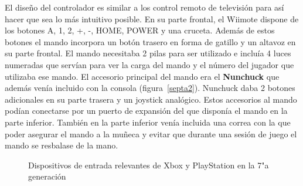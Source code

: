 El dise\~no del controlador es similar a los control remoto de televisi\'on para as\'i hacer que sea lo m\'as intuitivo posible. En su parte frontal, el Wiimote dispone de los botones A, 1, 2, +, -, HOME, POWER y una cruceta. Adem\'as de estos botones el mando incorpora un bot\'on trasero en forma de gatillo y un altavoz en su parte frontal. El mando necesitaba 2 pilas para ser utilizado e inclu\'ia 4 luces numeradas que serv\'ian para ver la carga del mando y el n\'umero del jugador que utilizaba ese mando. El accesorio principal del mando era el \textbf{Nunchuck} que adem\'as ven\'ia incluido con la consola (figura~\ref{septa2}). Nunchuck daba 2 botones adicionales en su parte trasera y un joystick anal\'ogico. Estos accesorios al mando pod\'ian conectarse por un puerto de expansi\'on del que dispon\'ia el mando en la parte inferior. Tambi\'en en la parte inferior ven\'ia incluida una correa con la que poder asegurar el mando a la mu\~neca y evitar que durante una sesi\'on de juego el mando se resbalase de la mano.\\

\begin{figure}[t]
     \hfill
{}
\hfill
{}
     \caption{Dispositivos de entrada relevantes de Xbox y PlayStation en la 7"a  generaci\'on}
     \label{fig:septima2}
   \end{figure}

